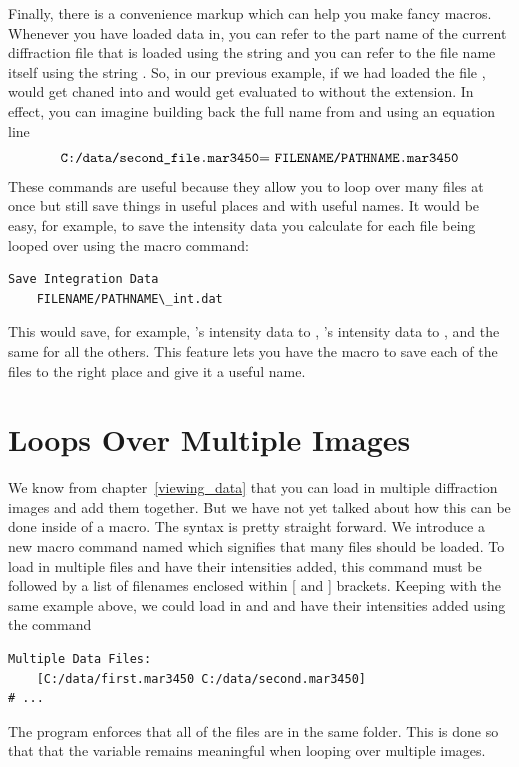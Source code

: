 Finally, there is a convenience markup which can help
you make fancy macros. Whenever you have loaded data 
in, you can refer to the part name of the current
diffraction file that is loaded using the string
 and you can refer to the file
name itself using the string . 
So, in our previous example, if we had loaded the
file ,
 would get chaned into 
 and  would
get evaluated to  without
the extension. In effect, you can imagine building 
back the full name from  and
 using an equation line
\begin{equation*}
    \text{{\tt C:/data/second\_file.mar3450}=
    {\tt FILENAME/PATHNAME.mar3450}}
\end{equation*}
These commands are useful because they allow you to
loop over many files at once but still save things 
in useful places and with useful names. It would be
easy, for example, to save the intensity data you
calculate for each file being looped over using the 
macro command:
\begin{lstlisting}[caption={'Using the FILENAME and PATHNAME Markup'}]
Save Integration Data
    FILENAME/PATHNAME\_int.dat
\end{lstlisting}
This would save, for example, 
's intensity data to
,
's intensity data 
to , and the
same for all the others. This feature lets you have
the macro to save each of the files to the right place
and give it a useful name.

\section{Loops Over Multiple Images}

We know from chapter~\ref{viewing_data} that
you can load in multiple diffraction images and add them
together. But we have not yet talked about how this can
be done inside of a macro. The syntax is pretty straight
forward. We introduce a new macro command named
 which signifies that
many files should be loaded. To load in multiple files
and have their intensities added, this command must be 
followed by a list of filenames enclosed within
[ and ] brackets. Keeping with the same example above,
we could load in  and
 and have their
intensities added using the command
\begin{lstlisting}[caption={'Add the intensities'}]
Multiple Data Files:
    [C:/data/first.mar3450 C:/data/second.mar3450]
# ...
\end{lstlisting}
The program enforces that
all of the files are in the same folder. This is done
so that that the  variable remains 
meaningful when looping over multiple images.

